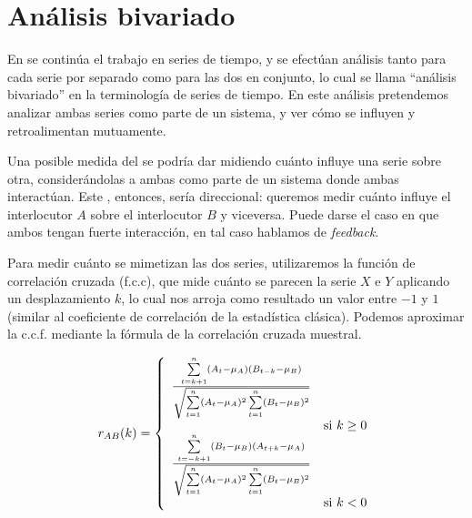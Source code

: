 \section{Análisis bivariado}
\label{sec:analisis_bivariado}

\newcommand{\squarederr}[1]{
    \sum\limits_{t=1}^n \varnorm{#1}^2
}

\newcommand{\crosscorr}[2]{
  \frac{\sum\limits_{t=|k|+1}^n \varnorm{#1} (#2_{t-k} - \mu_{#2})}{
    \sqrt{\squarederr{#1} \squarederr{#2}}
  } \\
}

\newcommand{\corrdenom}{\sqrt{\squarederr{A}\squarederr{B}}}

En \cite{KOU2008.2} se continúa el trabajo en series de tiempo, y se efectúan análisis tanto para cada serie por separado como para las dos en conjunto, lo cual se llama ``análisis bivariado'' en la terminología de series de tiempo. En este análisis pretendemos analizar ambas series como parte de un sistema, y ver cómo se influyen y retroalimentan mutuamente.

Una posible medida del \entrainment se podría dar midiendo cuánto influye una serie sobre otra, considerándolas a ambas como parte de un sistema donde ambas interactúan. Este \entrainment, entonces, sería direccional: queremos medir cuánto influye el interlocutor $A$ sobre el interlocutor $B$ y viceversa. Puede darse el caso en que ambos tengan fuerte interacción, en tal caso hablamos de \emph{feedback}.

Para medir cuánto se mimetizan las dos series, utilizaremos la función de correlación cruzada (f.c.c)\cite{CHATFIELD}, que mide cuánto se parecen la serie $X$ e $Y$ aplicando un desplazamiento $k$, lo cual nos arroja como resultado un valor entre $-1$ y $1$ (similar al coeficiente de correlación de la estadística clásica). Podemos aproximar la c.c.f. mediante la fórmula de la correlación cruzada muestral.

\begin{equation}
  \label{cross_correlation_definition}
  r_{AB}(k) =
  \left\{
    \begin{array}{ll}
      \frac{\sum\limits_{t=k+1}^n \varnorm{A} (B_{t-k} - \mu_{B})}{\corrdenom} \\ & \mbox{si } k \geq 0 \\
      \frac{\sum\limits_{t=-k+1}^n \varnorm{B} (A_{t+k} - \mu_{A})}{\corrdenom} \\  & \mbox{si } k < 0
    \end{array}
  \right.
\end{equation}

